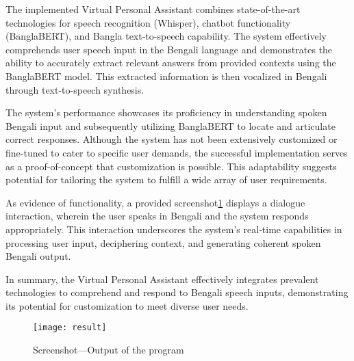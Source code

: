 The implemented Virtual Personal Assistant combines state-of-the-art technologies for speech recognition (Whisper), chatbot functionality (BanglaBERT), and Bangla text-to-speech capability.
The system effectively comprehends user speech input in the Bengali language and demonstrates the ability to accurately extract relevant answers from provided contexts using the BanglaBERT model.
This extracted information is then vocalized in Bengali through text-to-speech synthesis.

The system's performance showcases its proficiency in understanding spoken Bengali input and subsequently utilizing BanglaBERT to locate and articulate correct responses.
Although the system has not been extensively customized or fine-tuned to cater to specific user demands, the successful implementation serves as a proof-of-concept that customization is possible.
This adaptability suggests potential for tailoring the system to fulfill a wide array of user requirements.

As evidence of functionality, a provided screenshot\ref{fig:result} displays a dialogue interaction, wherein the user speaks in Bengali and the system responds appropriately.
This interaction underscores the system's real-time capabilities in processing user input, deciphering context, and generating coherent spoken Bengali output.

In summary, the Virtual Personal Assistant effectively integrates prevalent technologies to comprehend and respond to Bengali speech inputs, demonstrating its potential for customization to meet diverse user needs.

\begin{figure}
    \centering
    \texttt{[image: result]}
    \caption{Screenshot—Output of the program}\label{fig:result}
\end{figure}
